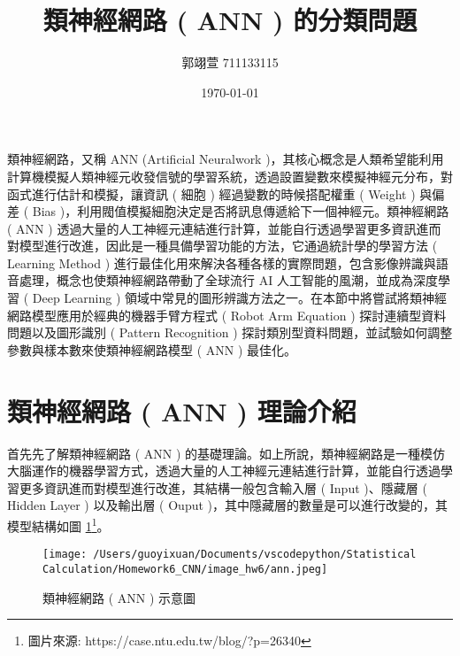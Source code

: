 \geometry{a4paper,left=2.5cm,right=2.5cm,top=2cm,bottom=2cm}
\usepackage{fancyhdr}

\title{{\MB 類神經網路 ( ANN ) 的分類問題}}	
\author{{\BB 郭翊萱 711133115}}				
\date{{\ST \today}} 			
 

\maketitle
\fontsize{12}{22pt}\selectfont 


類神經網路，又稱 ANN (Artificial Neuralwork )，其核心概念是人類希望能利用計算機模擬人類神經元收發信號的學習系統，透過設置變數來模擬神經元分布，對函式進行估計和模擬，讓資訊 ( 細胞 ) 經過變數的時候搭配權重 ( Weight ) 與偏差 ( Bias )，利用閥值模擬細胞決定是否將訊息傳遞給下一個神經元。類神經網路 ( ANN ) 透過大量的人工神經元連結進行計算，並能自行透過學習更多資訊進而對模型進行改進，因此是一種具備學習功能的方法，它通過統計學的學習方法 ( Learning Method ) 進行最佳化用來解決各種各樣的實際問題，包含影像辨識與語音處理，概念也使類神經網路帶動了全球流行 AI 人工智能的風潮，並成為深度學習 ( Deep Learning ) 領域中常見的圖形辨識方法之一。在本節中將嘗試將類神經網路模型應用於經典的機器手臂方程式 ( Robot Arm Equation ) 探討連續型資料問題以及圖形識別 ( Pattern Recognition ) 探討類別型資料問題，並試驗如何調整參數與樣本數來使類神經網路模型 ( ANN ) 最佳化。

\section{類神經網路 ( ANN ) 理論介紹}

首先先了解類神經網路 ( ANN ) 的基礎理論。如上所說，類神經網路是一種模仿大腦運作的機器學習方式，透過大量的人工神經元連結進行計算，並能自行透過學習更多資訊進而對模型進行改進，其結構一般包含輸入層 ( Input )、隱藏層 ( Hidden Layer ) 以及輸出層 ( Ouput  )，其中隱藏層的數量是可以進行改變的，其模型結構如圖 \ref{fig:ann}\footnote{圖片來源: https://case.ntu.edu.tw/blog/?p=26340}。

\begin{figure}[H]
    \centering
        \texttt{[image: /Users/guoyixuan/Documents/vscodepython/Statistical Calculation/Homework6\_CNN/image\_hw6/ann.jpeg]}
    \caption{類神經網路 ( ANN ) 示意圖}
    \label{fig:ann}
\end{figure}

